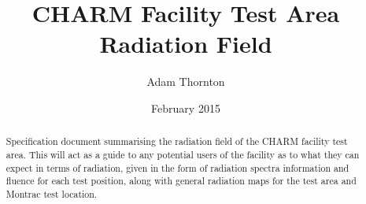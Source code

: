 \documentclass[12pt,a4paper]{report}
\begin{document}
\title{CHARM Facility Test Area Radiation Field}
\date{February 2015}
\author{Adam Thornton}
\maketitle

\begin{abstract}
Specification document summarising the radiation field of the CHARM facility test area. This will act as a guide to any potential users of the facility as to what they can expect in terms of radiation, given in the form of radiation spectra information and fluence for each test position, along with general radiation maps for the test area and Montrac test location. \\
\end{abstract}

\tableofcontents











\appendix


\end{document}
